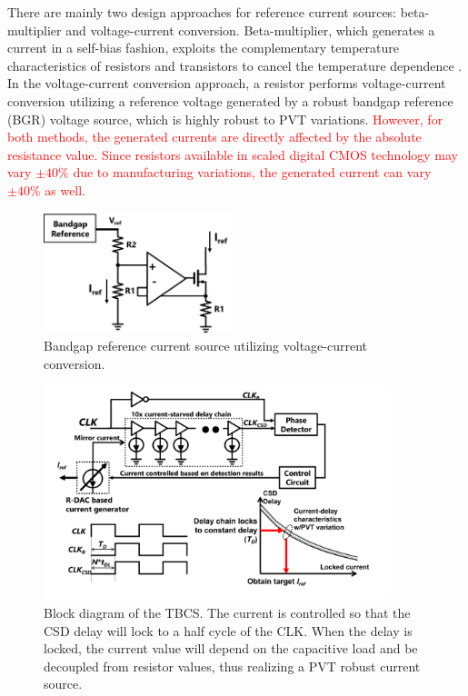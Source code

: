 \documentclass[paper]{ieice}
\begin{document}
There are mainly two design approaches for reference current sources: beta-multiplier and voltage-current conversion. Beta-multiplier, which generates a current in a self-bias fashion, exploits the complementary temperature characteristics of resistors and transistors to cancel the temperature dependence \cite{azcona2014precision, osipov2016temperature, osipov2019compact, wang20190, lee20121, wadhwa2017high}. In the voltage-current conversion approach, a resistor performs voltage-current conversion utilizing a reference voltage generated by a robust bandgap reference (BGR) voltage source, which is highly robust to PVT variations\cite{banba1999cmos, ueno2009300, ueno20101, huang2020sub, wu2015low}. \textcolor{red}{However, for both methods, the generated currents are directly affected by the absolute resistance value. Since resistors available in scaled digital CMOS technology may vary $\pm40\%$ due to manufacturing variations, the generated current can vary $\pm40\%$ as well.}

\begin{figure}[!t]
\centering
 \includegraphics[width=0.49\textwidth]{figs/fig1.png}
  \caption{Bandgap reference current source utilizing voltage-current conversion.}
\label{bandgap}
\end{figure}

\begin{figure}[!t]
\centering
 \includegraphics[width=0.9\textwidth]{figs/fig2.png}
  \caption{Block diagram of the TBCS. The current is controlled so that the CSD delay will lock to a half cycle of the CLK. When the delay is locked, the current value will depend on the capacitive load and be decoupled from resistor values, thus realizing a PVT robust current source.}
  \label{fig2}
\end{figure}
\end{document}
